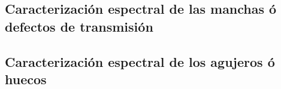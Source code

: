
\singlespacing
\subsection{Caracterización espectral de las manchas ó defectos de transmisión}
\label{sec:defctma}


\singlespacing
\subsection{Caracterización espectral de los agujeros ó huecos}
\label{sec:defctag}
